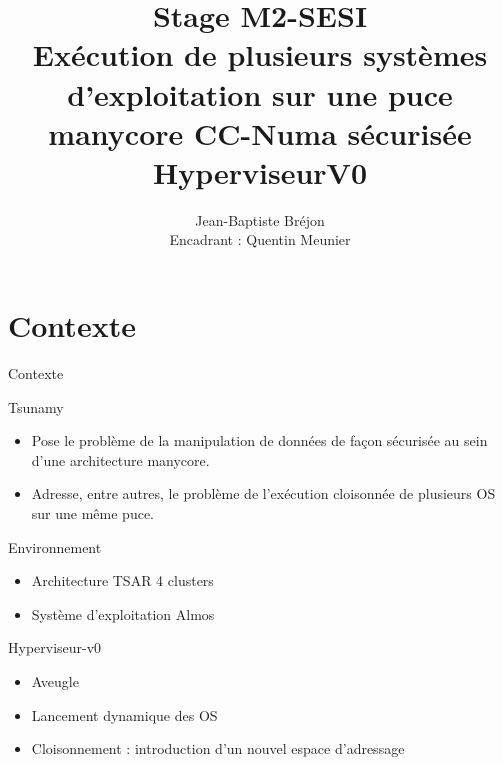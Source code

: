\documentclass[12pt,francais]{beamer}
\title{Stage M2-SESI \\ \textbf{Exécution de plusieurs systèmes d'exploitation sur une puce manycore CC-Numa sécurisée}\\HyperviseurV0}
\author{Jean-Baptiste Bréjon\\
Encadrant : Quentin Meunier}
\date{}
\begin{document}
\maketitle

\section*{Contexte}
\begin{frame}{Contexte}
        \begin{center}
                \begin{block}{Tsunamy}
                        \begin{itemize}
                                \item Pose le problème de la manipulation de données de façon sécurisée au sein d'une architecture manycore.
                                \item Adresse, entre autres, le problème de l'exécution cloisonnée de plusieurs OS sur une même puce.
                        \end{itemize}
                \end{block}
                \begin{block}{Environnement}
                        \begin{itemize}
                                \item Architecture TSAR 4 clusters 
                                \item Système d'exploitation Almos
                        \end{itemize}
                \end{block}
        \end{center}
\end{frame}

\begin{frame}{Hyperviseur-v0}
        \begin{center}
                \begin{itemize}
                        \item Aveugle
                        \item Lancement dynamique des OS
                        \item Cloisonnement : introduction d'un nouvel espace d'adressage
                \end{itemize}
        \end{center}
\end{frame}
\end{document}
